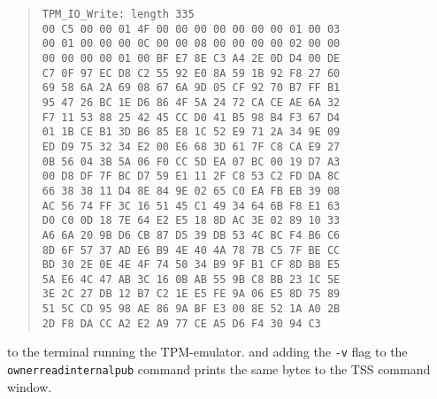 \documentclass[10pt]{article}
\newcommand{\command}[1]{\texttt{#1}}
\begin{document}
      \begin{quote}
        \texttt{TPM\_IO\_Write: length 335\\
         00 C5 00 00 01 4F 00 00 00 00 00 00 00 01 00 03\\
         00 01 00 00 00 0C 00 00 08 00 00 00 00 02 00 00\\
         00 00 00 00 01 00 BF E7 8E C3 A4 2E 0D D4 00 DE\\
         C7 0F 97 EC D8 C2 55 92 E0 8A 59 1B 92 F8 27 60\\
         69 58 6A 2A 69 08 67 6A 9D 05 CF 92 70 B7 FF B1\\
         95 47 26 BC 1E D6 86 4F 5A 24 72 CA CE AE 6A 32\\
         F7 11 53 88 25 42 45 CC D0 41 B5 98 B4 F3 67 D4\\
         01 1B CE B1 3D B6 85 E8 1C 52 E9 71 2A 34 9E 09\\
         ED D9 75 32 34 E2 00 E6 68 3D 61 7F C8 CA E9 27\\
         0B 56 04 3B 5A 06 F0 CC 5D EA 07 BC 00 19 D7 A3\\
         00 D8 DF 7F BC D7 59 E1 11 2F C8 53 C2 FD DA 8C\\
         66 38 38 11 D4 8E 84 9E 02 65 C0 EA FB EB 39 08\\
         AC 56 74 FF 3C 16 51 45 C1 49 34 64 6B F8 E1 63\\
         D0 C0 0D 18 7E 64 E2 E5 18 8D AC 3E 02 89 10 33\\
         A6 6A 20 9B D6 CB 87 D5 39 DB 53 4C BC F4 B6 C6\\
         8D 6F 57 37 AD E6 B9 4E 40 4A 78 7B C5 7F BE CC\\
         BD 30 2E 0E 4E 4F 74 50 34 B9 9F B1 CF 8D B8 E5\\
         5A E6 4C 47 AB 3C 16 0B AB 55 9B C8 BB 23 1C 5E\\
         3E 2C 27 DB 12 B7 C2 1E E5 FE 9A 06 E5 8D 75 89\\
         51 5C CD 95 98 AE 86 9A BF E3 00 8E 52 1A A0 2B\\
         2D F8 DA CC A2 E2 A9 77 CE A5 D6 F4 30 94 C3\\
       }
      \end{quote}

      to the terminal running the TPM-emulator.
      and adding the \command{-v} flag to the \\
      \command{ownerreadinternalpub} command
      prints the same bytes to the TSS command window.
\end{document}
